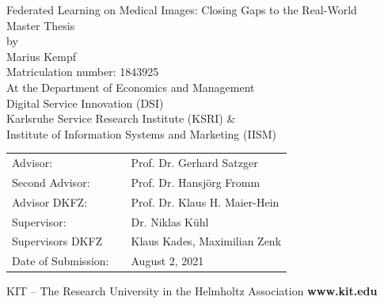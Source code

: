 \begin{titlepage}
\vspace*{0.5cm}
\begin{center}
		\Huge{Federated Learning on Medical Images: Closing Gaps to the Real-World}
		\vspace*{1.0cm}\\
		\Large{Master Thesis}\\
		\Large{by}\\
		\vspace*{0.5cm}
		\huge{Marius Kempf}\\
		\large{Matriculation number: 1843925}\\
		\vspace*{0.5cm}
		\Large{
			At the Department of Economics and Management
			\\ \vspace*{0.75cm}
			Digital Service Innovation (DSI)
			\\ \vspace*{0.5cm}
			Karlsruhe Service Research Institute (KSRI) \& \\
			Institute of Information Systems and Marketing (IISM)
		}
	\end{center}
	\vspace*{0.25cm}
\Large{
\begin{center}
\begin{tabular}[ht]{l c l}
  Advisor:          & \hfill    & Prof. Dr. Gerhard Satzger \\
  Second Advisor:   & \hfill    & Prof. Dr. Hansj\"org Fromm \\
  Advisor DKFZ:     & \hfill    & Prof. Dr. Klaus H. Maier-Hein \\
  Supervisor:       & \hfill    & Dr. Niklas K\"uhl \\
  Supervisors DKFZ  & \hfill    & Klaus Kades, Maximilian Zenk \\
  Date of Submission:  & \hfill & August 2, 2021 \\
\end{tabular}
\end{center}
}


\vspace*{1.0cm}
	\tiny{KIT -- The Research University in the Helmholtz Association} \hfill \small{\textbf{www.kit.edu} }
\end{titlepage}
